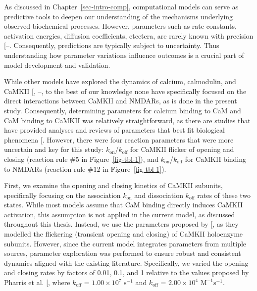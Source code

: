 \documentclass[
  11pt,
  letterpaper,
]{scrreprt}
\begin{document}
As discussed in Chapter~\ref{sec-intro-comp}, computational models can
serve as predictive tools to deepen our understanding of the mechanisms
underlying observed biochemical processes. However, parameters such as
rate constants, activation energies, diffusion coefficients, etcetera,
are rarely known with precision
{[}--\citeproc{ref-mcdonald2022Parameter}{474}{]}.
Consequently, predictions are typically subject to uncertainty. Thus
understanding how parameter variations influence outcomes is a crucial
part of model development and validation.

While other models have explored the dynamics of calcium, calmodulin,
and CaMKII {[},
--\citeproc{ref-bartol2024Spatial}{436}{]},
to the best of our knowledge none have specifically focused on the
direct interactions between CaMKII and NMDARs, as is done in the present
study. Consequently, determining parameters for calcium binding to CaM
and CaM binding to CaMKII was relatively straightforward, as there are
studies that have provided analyses and reviews of parameters that best
fit biological phenomena
{[}\citeproc{ref-linkevicius2025Fitting}{456}{]}. However, there were
four reaction parameters that were more uncertain and key for this
study: \(k_\text{on}\)/\(k_\text{off}\) for CaMKII flicker of opening
and closing (reaction rule \#5 in Figure~\ref{fig-tbl-1}), and
\(k_\text{on}\)/\(k_\text{off}\) for CaMKII binding to NMDARs (reaction
rule \#12 in Figure~\ref{fig-tbl-1}).

First, we examine the opening and closing kinetics of CaMKII subunits,
specifically focusing on the association \(k_\text{on}\) and
dissociation \(k_\text{off}\) rates of these two states. While most
models assume that CaM binding directly induces CaMKII activation, this
assumption is not applied in the current model, as discussed throughout
this thesis. Instead, we use the parameters proposed by
{[}\citeproc{ref-pharris2019Multistate}{185}{]}, as they modelled the
flickering (transient opening and closing) of CaMKII holoenzyme
subunits. However, since the current model integrates parameters from
multiple sources, parameter exploration was performed to ensure robust
and consistent dynamics aligned with the existing literature.
Specifically, we varied the opening and closing rates by factors of
0.01, 0.1, and 1 relative to the values proposed by Pharris et al.
{[}\citeproc{ref-pharris2019Multistate}{185}{]}, where \(k_\text{off}\)
= \(1.00 \times 10^7\) \(\mathrm{s}^{-1}\) and \(k_\text{off}\) =
\(2.00 \times 10^4\) \(\mathrm{M}^{-1}\mathrm{s}^{-1}\).
\end{document}
